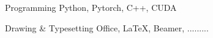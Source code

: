 \begin{cvskills}

  \cvskill
  {Programming} %
  {Python, Pytorch, C++, CUDA} %

  \cvskill
  {Drawing \& Typesetting} %
  {Office, \textrm{\LaTeX}, Beamer, .........} %
\end{cvskills}
